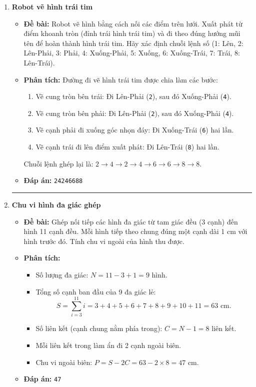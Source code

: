 \documentclass[11pt,a4paper]{article}
\begin{document}
\begin{enumerate}[label=\textbf{Câu \arabic*:}, leftmargin=*]
\item \textbf{Robot vẽ hình trái tim}
    \begin{itemize}
        \item \textbf{Đề bài:} Robot vẽ hình bằng cách nối các điểm trên lưới. Xuất phát từ điểm khoanh tròn (đỉnh trái hình trái tim) và đi theo đúng hướng mũi tên để hoàn thành hình trái tim. Hãy xác định chuỗi lệnh số (1: Lên, 2: Lên-Phải, 3: Phải, 4: Xuống-Phải, 5: Xuống, 6: Xuống-Trái, 7: Trái, 8: Lên-Trái).
        \item \textbf{Phân tích:}
            Đường đi vẽ hình trái tim được chia làm các bước:
            \begin{enumerate}
                \item Vẽ cung tròn bên trái: Đi Lên-Phải (\texttt{2}), sau đó Xuống-Phải (\texttt{4}).
                \item Vẽ cung tròn bên phải: Đi Lên-Phải (\texttt{2}), sau đó Xuống-Phải (\texttt{4}).
                \item Vẽ cạnh phải đi xuống góc nhọn đáy: Đi Xuống-Trái (\texttt{6}) hai lần.
                \item Vẽ cạnh trái đi lên điểm xuất phát: Đi Lên-Trái (\texttt{8}) hai lần.
            \end{enumerate}
            Chuỗi lệnh ghép lại là: $2 \to 4 \to 2 \to 4 \to 6 \to 6 \to 8 \to 8$.
        \item \textbf{Đáp án:} \texttt{24246688}
    \end{itemize}

\hrule
\vspace{0.5cm}

\item \textbf{Chu vi hình đa giác ghép}
    \begin{itemize}
        \item \textbf{Đề bài:} Ghép nối tiếp các hình đa giác từ tam giác đều (3 cạnh) đến hình 11 cạnh đều. Mỗi hình tiếp theo chung đúng một cạnh dài 1 cm với hình trước đó. Tính chu vi ngoài của hình thu được.
        \item \textbf{Phân tích:}
            \begin{itemize}
                \item Số lượng đa giác: $N = 11 - 3 + 1 = 9$ hình.
                \item Tổng số cạnh ban đầu của 9 đa giác lẻ:
                    $$S = \sum_{i=3}^{11} i = 3 + 4 + 5 + 6 + 7 + 8 + 9 + 10 + 11 = 63\text{ cm}.$$
                \item Số liên kết (cạnh chung nằm phía trong): $C = N - 1 = 8$ liên kết.
                \item Mỗi liên kết trong làm ẩn đi 2 cạnh ngoài biên.
                \item Chu vi ngoài biên: $P = S - 2C = 63 - 2 \times 8 = 47\text{ cm}$.
            \end{itemize}
        \item \textbf{Đáp án:} \texttt{47}
    \end{itemize}


\end{enumerate}
\end{document}
